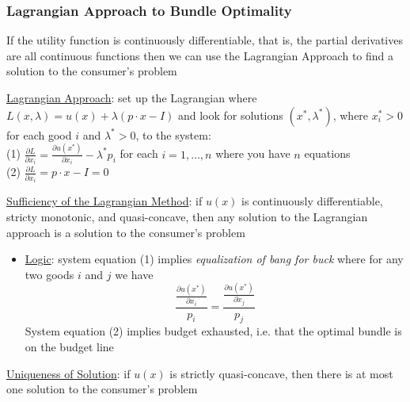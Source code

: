 \documentclass{article}
\begin{document}
\subsubsection{Lagrangian Approach to Bundle Optimality}
If the utility function is continuously differentiable, that is, the partial derivatives are all continuous functions then we can use the Lagrangian Approach to find a solution to the consumer's problem \par \vspace{0.3em}
  \underline{Lagrangian Approach}: set up the Lagrangian where $L(x, \lambda) = u(x) + \lambda (p \cdot x - I)$ and look for solutions $(x^{*}, \lambda^{*})$, where $x_{i}^{*} > 0$ for each good $i$ and $\lambda^{*} > 0$, to the system: \\
  (1) $\tfrac{\partial L}{\partial x_{i}} = \tfrac{\partial u(x^{*})}{\partial x_{i}} - \lambda^{*}p_{i}$ \quad for each $i = 1, \dots, n$ where you have $n$ equations \\
  (2) $\tfrac{\partial L}{\partial x_{i}} = p \cdot x - I = 0$
  \par
  \underline{Sufficiency of the Lagrangian Method}: if $u(x)$ is continuously differentiable, stricty monotonic, and quasi-concave, then any solution to the Lagrangian approach is a solution to the consumer's problem
  \begin{itemize}
    \item  \underline{Logic}: system equation (1) implies \textit{equalization of bang for buck} where for any two goods $i$ and $j$ we have $$\frac{\tfrac{\partial u(x^{*})}{\partial x_{i}}}{p_{i}} = \frac{\tfrac{\partial u(x^{*})}{\partial x_{j}}}{p_{j}}$$ System equation (2) implies budget exhausted, i.e. that the optimal bundle is on the budget line
  \end{itemize}
  \par
  \underline{Uniqueness of Solution}: if $u(x)$ is strictly quasi-concave, then there is at most one solution to the consumer's problem
\end{document}
